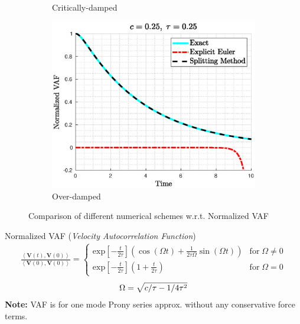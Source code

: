 \documentclass[a4paper,10pt]{beamer}
\newcommand{\BS}[1]{\boldsymbol{#1}}
\newcommand{\sqb}[1]{\left[ #1 \right]}
\newcommand{\rb}[1]{\left( #1 \right)}
\newcommand{\angbrac}[1]{\left \langle #1 \right \rangle}
\begin{document}
\begin{frame}
\begin{figure}[H]
\begin{subfigure}[b]{0.326\linewidth}
				\caption{Critically-damped}
			\end{subfigure}
			\begin{subfigure}[b]{0.326\linewidth}
				\includegraphics[width=\linewidth]{./Plots/CaseStudy/Overdamped.eps}
				\caption{Over-damped}
			\end{subfigure}
			\caption{Comparison of different numerical schemes w.r.t. Normalized VAF}
		\end{figure}
		\vspace{-0.5cm}
		\begin{alertblock}{Normalized VAF (\textit{Velocity Autocorrelation Function})}
			\begin{align}
				\frac{\angbrac{\BS{V}(t),\BS{V}(0)}}{\angbrac{\BS{V}(0),\BS{V}(0)}} = 
				\begin{cases}
				\text{exp} \sqb{-\frac{t}{2 \tau}} \rb{\cos\rb{\Omega t} + \frac{1}{2\tau\Omega} \sin\rb{\Omega t}}  &\text{for} \; \Omega \neq 0 \\
				\text{exp} \sqb{-\frac{t}{2 \tau}} \rb{1 + \frac{t}{2 \tau}} &\text{for} \; \Omega = 0
				\end{cases}
				\label{eq:oneModeExactVAF}
			\end{align}
			\begin{gather}
				\notag
				\Omega = \sqrt{c/\tau - 1/4\tau^{2}}
			\end{gather}
			\textbf{Note:} VAF is for one mode Prony series approx. without any conservative force terms.
		\end{alertblock}
	\end{frame}
\end{document}
